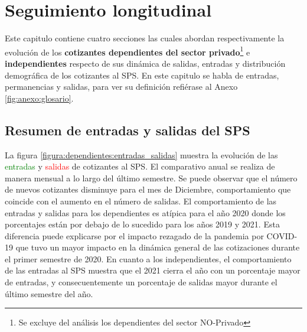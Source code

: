 \section{Seguimiento longitudinal}
Este capitulo contiene cuatro secciones las cuales abordan respectivamente la evolución de los \textbf{cotizantes dependientes del sector privado}\footnote{Se excluye del análisis los dependientes del sector NO-Privado} e \textbf{independientes} respecto de sus dinámica de salidas, entradas y distribución demográfica de los cotizantes al SPS. En este capitulo se habla de entradas, permanencias y salidas, para ver su definición refiérase al Anexo \ref{fig:anexo:glosario}.

\subsection{Resumen de entradas y salidas del SPS}
La figura \ref{figura:dependientes:entradas_salidas} muestra la evolución de las \textcolor{green}{entradas} y \textcolor{red}{salidas} de cotizantes al SPS. El comparativo anual se realiza de manera mensual a lo largo del último semestre. Se puede observar que el número de nuevos cotizantes disminuye para el mes de Diciembre, comportamiento que coincide con el aumento en el número de salidas. El comportamiento de las entradas y salidas para los dependientes es atípica para el año 2020 donde los porcentajes están por debajo de lo sucedido para los años 2019 y 2021. Esta diferencia puede explicarse por el impacto rezagado de la pandemia por COVID-19 que tuvo un mayor impacto en la dinámica general de las cotizaciones durante el primer semestre de 2020. En cuanto a los independientes, el comportamiento de las entradas al SPS muestra que el 2021 cierra el año con un porcentaje mayor de entradas, y consecuentemente un porcentaje de salidas mayor durante el último semestre del año. 

